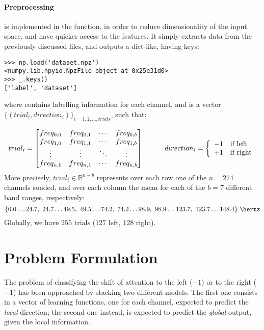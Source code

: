 \documentclass[10pt]{article}
\begin{document}
\paragraph{Preprocessing} is implemented in the  function, in order to reduce dimensionality of the input space, and have quicker access to the features. It simply extracts data from the previously discussed files, and outputs a  dict-like, having keys:
\begin{verbatim}
>>> np.load('dataset.npz')
<numpy.lib.npyio.NpzFile object at 0x25e31d0>
>>> _.keys()
['label', 'dataset']
\end{verbatim}
where  contains labelling information for each channel, and  is a vector $\{(trial_i, direction_i)\}_{i= 1, 2, \dots, trials}$, such that:

$$
trial_i  = 
 \begin{bmatrix}
   freq_{0, 0} & freq_{0, 1} & \cdots & freq_{0, b}  \\
   freq_{1, 0} & freq_{1, 1} & \cdots & freq_{1, b}  \\
   \vdots      & \vdots      & \ddots & \vdots       \\
   freq_{n, 0} & freq_{n, 1} & \cdots & freq_{n, b} 
 \end{bmatrix}
\hspace{30pt}
 direction_i = \left\{
 \begin{array}{l l}
   -1 & \text{if left}\\
   +1 & \text{if right}\\
 \end{array}\right .
$$
More precisely, $trial_i \in \mathbb{R} ^{n+b}$ represents over each row one of the $n=274$ channels sonded, and over each column the mean for each of the $b=7$ different band ranges, respectively:
$$
\{0.0 \dots 24.7,\ 24.7 \dots 49.5,\ 49.5 \dots 74.2,\ 74.2 \dots 98.9,\ 98.9 \dots 123.7,\ 123.7 \dots 148.4\} \ \hertz
$$
Globally, we have $255$ trials ($127$ left, $128$ right).


\section{Problem Formulation}
The problem of classifying the shift of attention to
the left ($-1$) or to the right ($-1$) has been
approached by stacking\cite{Wolpert92} two different
models. The first one consists in a vector of
learning functions, one for each channel, expected to
predict the \emph{local} direction; the second one
instead, is expected to predict the \emph{global}
output, given the local information.
\end{document}
